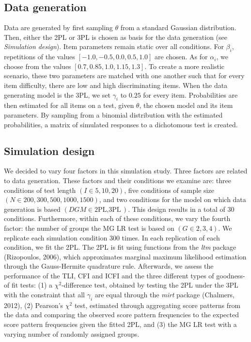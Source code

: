 \documentclass[Royal,sageapa,times,doublespace]{sagej}
\begin{document}
\subsection{Data generation}
Data are generated by first sampling $\theta$ from a standard Gaussian distribution. Then, either the 2PL or 3PL is chosen as basis for the data generation (see \textit{Simulation design}). Item parameters remain static over all conditions. For $\beta_i$, repetitions of the values $[-1.0, -0.5, 0.0, 0.5, 1.0]$ are chosen. As for $\alpha_i$, we choose from the values $[0.7, 0.85, 1.0, 1.15, 1.3]$. To create a more realistic scenario, these two parameters are matched with one another such that for every item difficulty, there are low and high discriminating items. When the data generating model is the 3PL, we set $\gamma_i$ to $0.25$ for every item. Probabilities are then estimated for all items on a test, given $\theta$, the chosen model and its item parameters. By sampling from a binomial distribution with the estimated probabilities, a matrix of simulated responses to a dichotomous test is created.
\subsection{Simulation design}
We decided to vary four factors in this simulation study. Three factors are related to data generation. These factors and their conditions we examine are: three conditions of test length $(I \in{5,10,20})$, five conditions of sample size $(N \in{200, 300, 500, 1000, 1500})$, and two conditions for the model on which data generation is based $(DGM \in{\text{2PL}, \text{3PL}})$. This design results in a total of $30$ conditions. Furthermore, within each of these conditions, we vary the fourth factor: the number of groups the MG LR test is based on $(G \in{2, 3, 4})$. We replicate each simulation condition 300 times. In each replication of each condition, we fit the 2PL. The 2PL is fit using functions from the \textit{ltm} package (Rizopoulos, 2006), which approximates marginal maximum likelihood estimation through the Gauss-Hermite quadrature rule. Afterwards, we assess the performance of the TLI, CFI and ICFI and the three different types of goodness-of fit tests: (1) a $\chi^2$-difference test, obtained by testing the 2PL under the 3PL with the constraint that all $\gamma_i$ are equal through the \textit{mirt} package (Chalmers, 2012), (2) Pearson's $\chi^2$ test, estimated through aggregating score patterns from the data and comparing the observed score pattern frequencies to the expected score pattern frequencies given the fitted 2PL, and (3) the MG LR test with a varying number of randomly assigned groups. 
\end{document}
